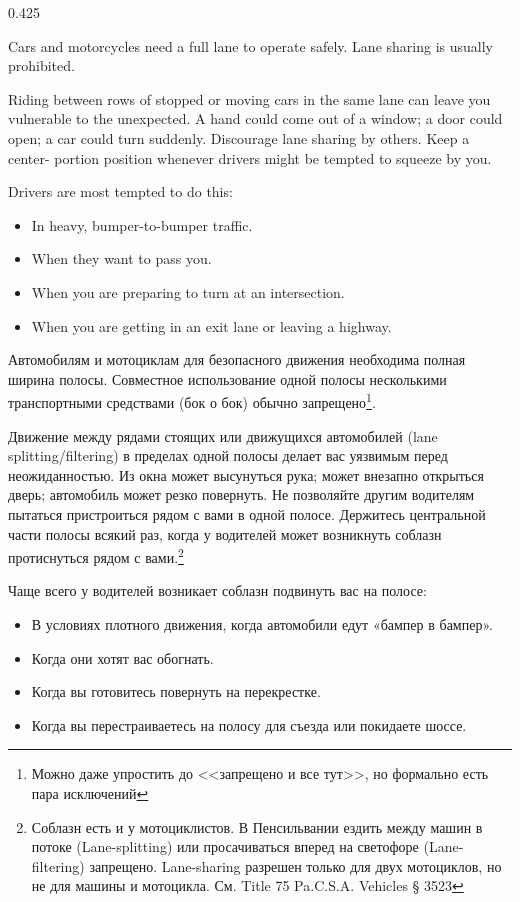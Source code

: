 





\begin{langblock}{0.425}
	\begin{eng}
	Cars and motorcycles need a full lane to operate safely. Lane sharing is usually prohibited.
	
	Riding between rows of stopped or moving cars in the same lane can leave you vulnerable to the unexpected. A hand could come out of a window; a door could open; a car could turn suddenly. Discourage lane sharing by others. Keep a center- portion position whenever drivers might be tempted to squeeze by you.
	
	Drivers are most tempted to do this:
	\begin{itemize}[noitemsep]
		\item In heavy, bumper-to-bumper traffic.
		\item When they want to pass you.
		\item When you are preparing to turn at an intersection.
		\item When you are getting in an exit lane or leaving a highway.
	\end{itemize}
	\end{eng}
	\begin{rus}
		Автомобилям и мотоциклам для безопасного движения необходима полная ширина полосы. Совместное использование одной полосы несколькими транспортными средствами (бок о бок) обычно запрещено\footnote{Можно даже упростить до <<запрещено и все тут>>, но формально есть пара исключений}.
		
		Движение между рядами стоящих или движущихся автомобилей (lane splitting/filtering) в пределах одной полосы делает вас уязвимым перед неожиданностью. Из окна может высунуться рука; может внезапно открыться дверь; автомобиль может резко повернуть. Не позволяйте другим водителям пытаться пристроиться рядом с вами в одной полосе. Держитесь центральной части полосы всякий раз, когда у водителей может возникнуть соблазн протиснуться рядом с вами.\footnote{Соблазн есть и у мотоциклистов. В Пенсильвании ездить между машин в потоке (Lane-splitting) или просачиваться вперед на светофоре (Lane-filtering) запрещено. Lane-sharing разрешен только для двух мотоциклов, но не для машины и мотоцикла. См.  Title 75 Pa.C.S.A. Vehicles § 3523}
		
		Чаще всего у водителей возникает соблазн подвинуть вас на полосе:
		\begin{itemize}[noitemsep]
			\item В условиях плотного движения, когда автомобили едут «бампер в бампер».
			\item Когда они хотят вас обогнать.
			\item Когда вы готовитесь повернуть на перекрестке.
			\item Когда вы перестраиваетесь на полосу для съезда или покидаете шоссе.
		\end{itemize}
\end{rus}
\end{langblock}




